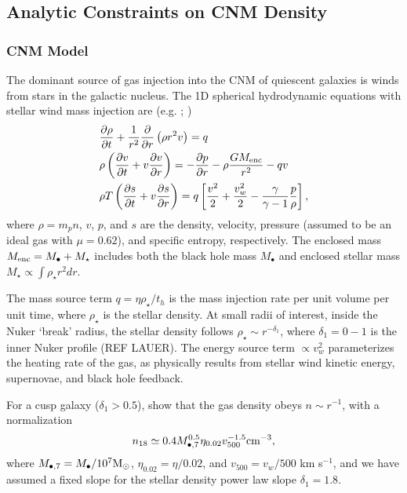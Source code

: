 \documentclass[usenatbib,fleqn]{mnras}
\newcommand{\Mbh}[1][]{M_{\bullet#1}}
\newcommand{\Menc}{M_{\rm enc}}
\renewcommand{\th}{t_h}
\newcommand{\Msun}{{\rm M_\odot}}
\begin{document}
\subsection{Analytic Constraints on CNM Density}

\subsubsection{CNM Model}

The dominant source of gas injection into the CNM of quiescent
galaxies is winds from stars in the galactic nucleus. The 1D spherical
hydrodynamic equations with stellar wind mass injection are
(e.g. \citealt{Holzer+1970}; \citealt{Quataert04}) 
\begin{align}
  &\frac{\partial \rho}{\partial t}+\frac{1}{r^2}\frac{\partial}{\partial r}\left(\rho r^2 v\right)=q \label{eq:drhodt}\\
  &\rho \left(\frac{\partial v}{\partial t} + v\frac{\partial
      v}{\partial r}\right) =-\frac{\partial p}{\partial r}- \rho\frac{GM_{\rm enc}}{r^{2}} -q v \label{eq:dvdt}\\
  &\rho T\left(\frac{\partial s}{\partial t} + v\frac{\partial
      s}{\partial
      r}\right)=q\left[\frac{v^2}{2}+\frac{v_w^2}{2}-\frac{\gamma}{\gamma-1}
    \frac{p}{\rho} \right] ,
\label{eq:dsdt}
\end{align}
where $\rho = m_p n$, $v$, $p$, and $s$ are the density, velocity, pressure (assumed to be an ideal gas with $\mu = 0.62$), and
specific entropy, respectively.  The enclosed mass $\Menc = M_{\bullet} + M_{\star}$ includes both the black hole mass $M_{\bullet}$ and enclosed stellar mass $M_{\star} \propto \int \rho_{\star}r^{2}dr$.  

The mass source term $q =\eta \rho_\star/\th$ is the mass injection rate per unit volume per unit time, where $\rho_\star$ is the stellar density.  At small radii of interest, inside the Nuker `break' radius, the stellar density follows $\rho_\star\sim r^{-\delta_1}$, where $\delta_1 = 0-1$ is the inner Nuker profile (REF LAUER).  The energy source term $\propto v_w^{2}$ parameterizes the heating rate of the gas, as physically results from stellar wind kinetic energy, supernovae, and black hole feedback.  

For a cusp galaxy ($\delta_1> 0.5$), \citet{Generozov+2015} show that the gas density obeys $n \sim
r^{-1}$, with a normalization
\begin{equation}
n_{18}\simeq 0.4 \Mbh[,7]^{0.5} \eta_{0.02} v_{500}^{-1.5} {\rm
  cm^{-3}},
\label{eq:n18}
\end{equation}
where $\Mbh[,7]= \Mbh/10^7 \Msun$,
$\eta_{0.02}= \eta/0.02$, and $v_{500}=v_w/500$ km s$^{-1}$, and we have assumed a fixed slope for the stellar density
power law slope $\delta_1=1.8$. 
\end{document}
